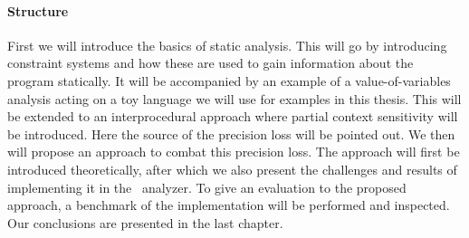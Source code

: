 \paragraph{Structure} 
First we will introduce the basics of static analysis. This will go by introducing constraint systems and how these are used to gain information about the program statically. It will be accompanied by an example of a value-of-variables analysis acting on a toy language we will use for examples in this thesis. This will be extended to an interprocedural approach where partial context sensitivity will be introduced. Here the source of the precision loss will be pointed out. We then will propose an approach to combat this precision loss. The approach will first be introduced theoretically, after which we also present the challenges and results of implementing it in the \gob\ analyzer. To give an evaluation to the proposed approach, a benchmark of the implementation will be performed and inspected. Our conclusions are presented in the last chapter.
